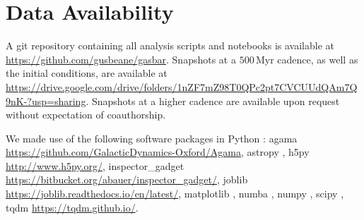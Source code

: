 \documentclass[fleqn,usenatbib]{mnras}
\newcommand{\Myr}{\ensuremath{\textrm{Myr}}}
\begin{document}
\section*{Data Availability}
A git repository containing all analysis scripts and notebooks is available at
\url{https://github.com/gusbeane/gasbar}. Snapshots at a $500\,\Myr$ cadence, as
well as the initial conditions, are available at
\url{https://drive.google.com/drive/folders/1nZF7mZ98T0QPc2pt7CVCUUdQAm7Q9nK-?usp=sharing}.
Snapshots at a higher cadence are available upon request without expectation of
coauthorship.

We made use of the following software packages in {\sc Python} \citep{Python}:
{\sc agama} \url{https://github.com/GalacticDynamics-Oxford/Agama}, {\sc
astropy} \citep{astropy:2013, astropy:2018}, {\sc h5py}
\url{http://www.h5py.org/}, {\sc inspector\_gadget}
\url{https://bitbucket.org/abauer/inspector_gadget/}, {\sc joblib}
\url{https://joblib.readthedocs.io/en/latest/}, {\sc matplotlib}
\citep{Hunter:2007}, {\sc numba} \citep{Lam:2015bfh}, {\sc numpy}
\citep{harris2020array}, {\sc scipy} \citep{2020SciPy-NMeth}, {\sc tqdm}
\url{https://tqdm.github.io/}.










\appendix
\end{document}
